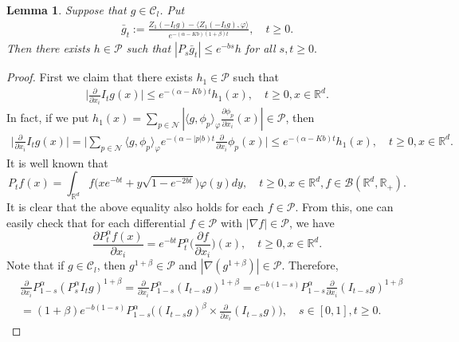 \documentclass[12pt,a4paper]{amsart}
\theoremstyle{plain}
\newtheorem{lem}[thm]{Lemma}
\theoremstyle{definition}
\numberwithin{equation}{section}
\begin{document}
\begin{lem}
  \label{control of gn} 
  Suppose that $g\in \mathcal{C}_l$.
  Put
  \begin{align}
    \bar{g}_t
    :=\frac{Z_1(-I_tg)-\langle Z_1(-I_tg),\varphi\rangle}{e^{-(\alpha-Kb)(1+\beta)t}},\quad t\geq 0.
  \end{align}
  Then there exists $h\in \mathcal{P}$ such that
  $|P_s\bar{g}_t| \leq e^{-bs}h$ for all $s, t\geq 0.$
\end{lem}
\begin{proof}
  First we claim that there exists $h_1\in \mathcal P$ such that
\begin{align}
  \label{ineq: control of partial derivative of Itg}
  \Big|\frac{\partial}{\partial x_i}I_tg(x)\Big| \leq e^{-(\alpha-Kb)t}h_1(x),
  \quad  t\geq 0, x\in \mathbb R^d.
\end{align}
In fact, if we put $h_1(x)=\sum_{p\in \mathcal N}|\langle g, \phi_p\rangle_\varphi\frac{\partial \phi_p}{\partial x_i}(x)| \in \mathcal P$, then
\begin{align}
  \Big|\frac{\partial}{\partial x_i}I_tg(x)\Big| =
  \Big|\sum_{p\in \mathcal N}\langle g, \phi_p\rangle_\varphi e^{-(\alpha-|p|b)t} \frac{\partial}{\partial x_i}\phi_p(x)\Big|
  \leq e^{-(\alpha-Kb)t}h_1(x)
  , \quad t\geq 0, x\in \mathbb R^d.
\end{align}
It is well known that
\[
  P_t f(x) = \int_{\mathbb R^d} f\big(x e^{-bt} + y \sqrt{1-e^{-2bt}}\big) \varphi(y) dy,
  \quad t\geq 0, x\in \mathbb R^d, f\in \mathcal B(\mathbb R^d, \mathbb R_+).
\]
It is clear that the above equality also holds for each $f\in \mathcal P$.
From this, one can easily check that for each differential $f \in \mathcal P$ with $|\nabla  f| \in \mathcal P$, we have
\[
  \frac{\partial P_t^\alpha f(x)}{\partial x_i} = e^{-bt} P_t^\alpha\Big(\frac{\partial f}{\partial x_i}\Big)(x), \quad t\geq 0, x\in \mathbb R^d.
\]
Note that if $g \in \mathcal C_l$, then $g^{1+\beta}\in \mathcal P$ and $|\nabla (g^{1+\beta})| \in \mathcal P$.
Therefore,
\begin{align}
  & \frac{\partial}{\partial x_i} P_{1-s}^\alpha  (P_s^\alpha I_t g)^{1+\beta}
    = \frac{\partial}{\partial x_i} P_{1-s}^\alpha (I_{t-s} g)^{1+\beta}
    = e^{-b(1-s)} P_{1-s}^\alpha \frac{\partial}{\partial x_i} (I_{t-s}g)^{1+\beta} \\
  & =(1+\beta)e^{-b(1-s)} P_{1-s}^\alpha \Big( (I_{t-s}g)^\beta \times \frac{\partial}{\partial x_i} (I_{t-s}g) \Big),\quad s\in [0,1], t\geq 0.

\end{align}
\end{proof}
\end{document}
